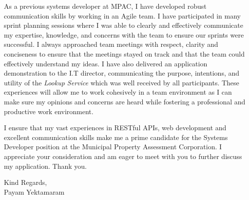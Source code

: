 \documentclass[letterpaper,11pt]{article}
\begin{document}
\bigbreak
\noindent

As a previous systems developer at MPAC, I have developed robust communication skills by working in an Agile team. I have participated in many sprint planning sessions where I was able to clearly and effectively communicate my expertise, knowledge, and concerns with the team to ensure our sprints were successful. I always approached team meetings with respect, clarity and conciseness to ensure that the meetings stayed on track and that the team could effectively understand my ideas. I have also delivered an application demonstration to the I.T director, communicating the purpose, intentions, and utility of the \textit{Lookup Service} which was well received by all participants. These experiences will allow me to work cohesively in a team environment as I can make sure my opinions and concerns are heard while fostering a professional and productive work environment.

\bigbreak
\noindent I ensure that my vast experiences in RESTful APIs, web development and excellent communication skills make me a prime candidate for the Systems Developer position at the Municipal Property Assessment Corporation. I appreciate your consideration and am eager to meet with you to further discuss my application. Thank you. 

\bigbreak

Kind Regards, \\ \vspace{10pt}
Payam Yektamaram
\end{document}
